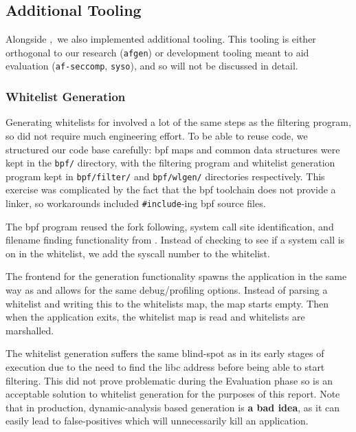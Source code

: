 \subsection{Additional Tooling}

Alongside \afss,~we also implemented additional tooling. This tooling is either
orthogonal to our research (\texttt{afgen}) or development tooling
meant to aid evaluation (\texttt{af-seccomp}, \texttt{syso}), and so will not be
discussed in detail. 

\subsubsection{Whitelist Generation}\label{subsubsec:impl-whitelist-gen}

Generating whitelists for \af involved a lot of the same steps as the filtering
program, so did not require much engineering effort. To be able to reuse code,
we structured our code base carefully: \ac{bpf} maps and common data structures
were kept in the \texttt{bpf/} directory, with the filtering program and
whitelist generation program kept in \texttt{bpf/filter/} and
\texttt{bpf/wlgen/} directories respectively. This exercise was complicated by
the fact that the \ac{bpf} toolchain does not provide a linker, so workarounds
included \texttt{\#include}-ing \ac{bpf} source files.

The \ac{bpf} program reused the fork following, system call site identification, and
filename finding functionality from \afss. Instead of checking to see if a
system call is on in the whitelist, we add the syscall number to the whitelist. 

The frontend for the generation functionality spawns the application in the same
way as \af and allows for the same debug/profiling options. Instead of parsing a
whitelist and writing this to the whitelists map, the map starts empty. Then
when the application exits, the whitelist map is read and whitelists are
marshalled.

The whitelist generation suffers the same blind-spot as \af in its early stages
of execution due to the need to find the \ac{libc} address before being able to
start filtering. This did not prove problematic during the Evaluation phase so
is an acceptable solution to whitelist generation for the purposes of this
report. Note that in production, dynamic-analysis based generation is \textbf{a
bad idea}, as it can easily lead to false-positives which will unnecessarily
kill an application.

